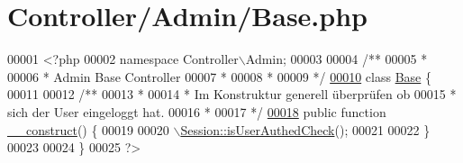 \hypertarget{_controller_2_admin_2_base_8php}{\section{Controller/\-Admin/\-Base.php}
\label{_controller_2_admin_2_base_8php}
}

\begin{DoxyCode}
00001 <?php
00002 \textcolor{keyword}{namespace }Controller\(\backslash\)Admin;
00003 \textcolor{comment}{}
00004 \textcolor{comment}{/**}
00005 \textcolor{comment}{ * }
00006 \textcolor{comment}{ * Admin Base Controller}
00007 \textcolor{comment}{ * }
00008 \textcolor{comment}{ * }
00009 \textcolor{comment}{ */}
\hypertarget{_controller_2_admin_2_base_8php_source_l00010}{}\hyperlink{class_controller_1_1_admin_1_1_base}{00010} \textcolor{keyword}{class }\hyperlink{class_controller_1_1_admin_1_1_base}{Base} \{
00011         \textcolor{comment}{}
00012 \textcolor{comment}{        /** }
00013 \textcolor{comment}{         * }
00014 \textcolor{comment}{         * Im Konstruktur generell überprüfen ob }
00015 \textcolor{comment}{         * sich der User eingeloggt hat.}
00016 \textcolor{comment}{         * }
00017 \textcolor{comment}{         */}
\hypertarget{_controller_2_admin_2_base_8php_source_l00018}{}\hyperlink{class_controller_1_1_admin_1_1_base_a7e433734833c21c222186860f4cd8ce5}{00018}         \textcolor{keyword}{public} \textcolor{keyword}{function} \hyperlink{class_controller_1_1_admin_1_1_base_a7e433734833c21c222186860f4cd8ce5}{\_\_construct}() \{
00019                 
00020                 \hyperlink{class_session_a49f0fb7185ab07bdbf6bdff477b43ff8}{\(\backslash\)Session::isUserAuthedCheck}();
00021                 
00022         \}
00023         
00024 \}
00025 ?>
\end{DoxyCode}
